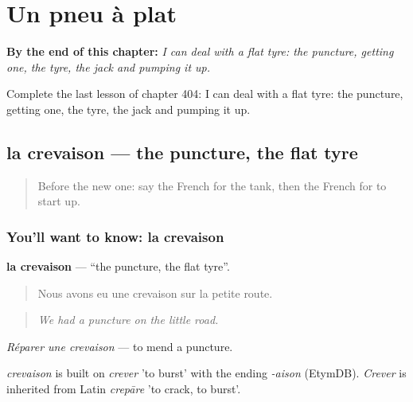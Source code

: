 
\chapter{Un pneu à plat}
\label{ch:fr-un-pneu-a-plat}

\begin{chapteropening}
\textbf{By the end of this chapter:} \emph{I can deal with a flat tyre: the puncture, getting one, the tyre, the jack and pumping it up.}

Complete the last lesson of chapter 404: I can deal with a flat tyre: the puncture, getting one, the tyre, the jack and pumping it up.
\end{chapteropening}

\section[la crevaison]{la crevaison — the puncture, the flat tyre}

\label{lesson:FR-C404-crevaison}



\begin{quote}
Before the new one: say the French for the tank, then the French for to start up.
\end{quote}

\subsection*{You'll want to know: la crevaison}
\textbf{la crevaison} — \textquotedblleft{}the puncture, the flat tyre\textquotedblright{}.

\begin{quote}
Nous avons eu une crevaison sur la petite route.
\end{quote}

\begin{quote}
\emph{We had a puncture on the little road.}
\end{quote}

\emph{Réparer une crevaison} — to mend a puncture.

\begin{cousinweb}
\emph{crevaison} is built on \emph{crever} 'to burst' with the ending \emph{-aison} (EtymDB). \emph{Crever} is inherited from Latin \emph{crepāre} 'to crack, to burst'.
\end{cousinweb}

